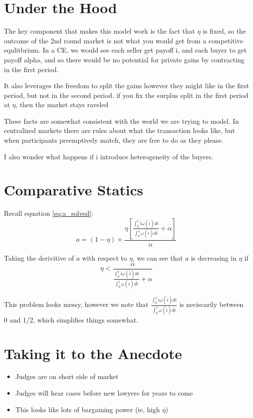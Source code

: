 \documentclass[WP]{AEA}
\begin{document}
\section{Under the Hood}
The key component that makes this model work is the fact that $\eta$ is fixed, so the outcome of the 2nd round market is not what you would get from a competitive equlitbrium.  In a CE, we would see each seller get payoff i, and each buyer to get payoff alpha, and so there would be no potential for private gains by contracting in the first period.  

It also leverages the freedom to split the gains however they might like in the first period, but not in the second period.  if you fix the surplus split in the first period at $\eta$, then the market stays raveled

These facts are somewhat consistent with the world we are trying to model.  In centralized markets there are rules about what the transaction looks like, but when participants preemptively match, they are free to do as they please.

I also wonder what happens if i introduce heterogeneity of the buyers.  

\section{Comparative Statics}

Recall equation \ref{eq:a_solved}:
\begin{equation*}
 	a= (1-\eta) + \frac{   \eta\left[ \frac{\int_0^1 \hat{i} \omega(\hat{i}) di}{\int_0^1  \omega(\hat{i}) d\hat{i}} + \alpha  \right] }{\alpha} 
\end{equation*}

Taking the derivitive of $a$ with respect to $\eta$, we can see that 
$a$ is decreasing in $\eta$ if
\begin{equation*}
	\eta  < \frac{\alpha }{ \frac{\int_0^1 \hat{i} \omega(\hat{i}) di}{\int_0^1  \omega(\hat{i}) d\hat{i}} + \alpha  }
\end{equation*}

This problem looks messy, however we note that $ \frac{\int_0^1 \hat{i} \omega(\hat{i}) di}{\int_0^1  \omega(\hat{i}) d\hat{i}}$ is neciscarily between 0 and 1/2, which simplifies things somewhat.


\section{Taking it to the Anecdote}
\begin{itemize}

    \item Judges are on short  side of market
\item Judges will hear cases before new lawyers for years to come
\item This looks like lots of bargaining power (ie, high $\eta$)
\end{itemize}
\end{document}
